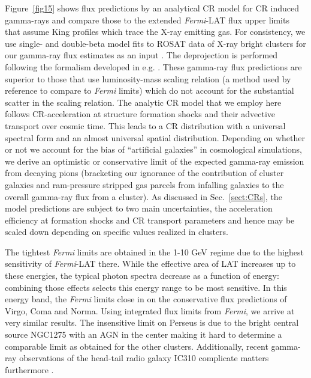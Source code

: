 \documentclass[10pt,aps,pra,reprint,amsmath,amsfonts,amssymb,showpacs,nofootinbib,floatfix]{revtex4-1}
\newcommand{\Fermi}{{\em Fermi}\xspace}
\begin{document}
Figure~\ref{fig15} shows flux predictions by an analytical CR model
\cite{2010MNRAS.409..449P} for CR induced gamma-rays and compare those
to the extended \Fermi-LAT flux upper limits that assume King profiles
which trace the X-ray emitting gas. For consistency, we use single-
and double-beta model fits to ROSAT data of X-ray bright clusters for
our gamma-ray flux estimates as an input
\cite{2007A&A...466..805C}. The deprojection is performed following
the formalism developed in e.g. \cite{2004A&A...413...17P}. These
gamma-ray flux predictions are superior to those that use
luminosity-mass scaling relation (a method used by reference
\cite{2010ApJ...717L..71A} to compare to \Fermi limits) which do not
account for the substantial scatter in the scaling relation. The
analytic CR model that we employ here follows CR-acceleration at
structure formation shocks and their advective transport over cosmic
time. This leads to a CR distribution with a universal spectral form
and an almost universal spatial distribution. Depending on whether or
not we account for the bias of ``artificial galaxies'' in cosmological
simulations, we derive an optimistic or conservative limit of the
expected gamma-ray emission from decaying pions (bracketing our
ignorance of the contribution of cluster galaxies and ram-pressure
stripped gas parcels from infalling galaxies to the overall gamma-ray
flux from a cluster). As discussed in Sec.~\ref{sect:CRs}, the model
predictions are subject to two main uncertainties, the acceleration
efficiency at formation shocks and CR transport parameters and hence
may be scaled down depending on specific values realized in clusters.

The tightest \Fermi limits are obtained in the 1-10 GeV regime due to
the highest sensitivity of \Fermi-LAT there. While the effective area
of LAT increases up to these energies, the typical photon spectra
decrease as a function of energy: combining those effects selects this
energy range to be most sensitive. In this energy band, the \Fermi
limits close in on the conservative flux predictions of Virgo, Coma
and Norma. Using integrated flux limits from \Fermi, we arrive at very
similar results. The insensitive limit on Perseus is due to the
bright central source NGC1275 with an AGN in the center
\cite{2010ATel.2916....1M} making it hard to determine a comparable
limit as obtained for the other clusters. Additionally, recent
gamma-ray observations of the head-tail radio galaxy IC310 complicate
matters furthermore \cite{2010ApJ...723L.207A,2010A&A...519L...6N}.
\end{document}
